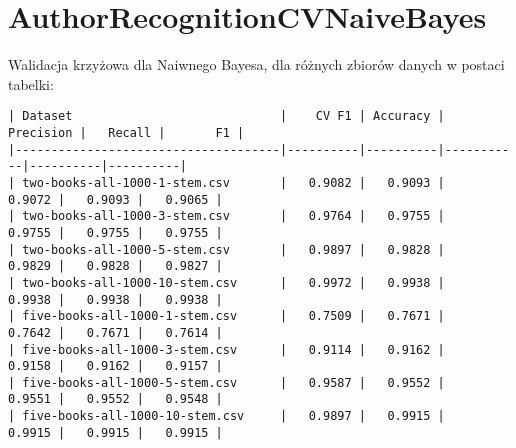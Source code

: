 \documentclass{article}
\begin{document}
\section{AuthorRecognitionCVNaiveBayes}
Walidacja krzyżowa dla Naiwnego Bayesa, dla różnych zbiorów danych w postaci tabelki:

\begin{verbatim}
| Dataset                             |    CV F1 | Accuracy | Precision |   Recall |       F1 |
|-------------------------------------|----------|----------|-----------|----------|----------|
| two-books-all-1000-1-stem.csv       |   0.9082 |   0.9093 |    0.9072 |   0.9093 |   0.9065 |
| two-books-all-1000-3-stem.csv       |   0.9764 |   0.9755 |    0.9755 |   0.9755 |   0.9755 |
| two-books-all-1000-5-stem.csv       |   0.9897 |   0.9828 |    0.9829 |   0.9828 |   0.9827 |
| two-books-all-1000-10-stem.csv      |   0.9972 |   0.9938 |    0.9938 |   0.9938 |   0.9938 |
| five-books-all-1000-1-stem.csv      |   0.7509 |   0.7671 |    0.7642 |   0.7671 |   0.7614 |
| five-books-all-1000-3-stem.csv      |   0.9114 |   0.9162 |    0.9158 |   0.9162 |   0.9157 |
| five-books-all-1000-5-stem.csv      |   0.9587 |   0.9552 |    0.9551 |   0.9552 |   0.9548 |
| five-books-all-1000-10-stem.csv     |   0.9897 |   0.9915 |    0.9915 |   0.9915 |   0.9915 |
\end{verbatim}
\end{document}
